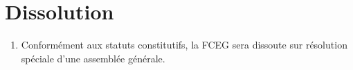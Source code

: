 \section{Dissolution}
\label{dissolution}

\begin{enumerate}
 \item Conformément aux statuts constitutifs, la FCEG sera dissoute sur résolution spéciale d'une assemblée générale.
\end{enumerate}
